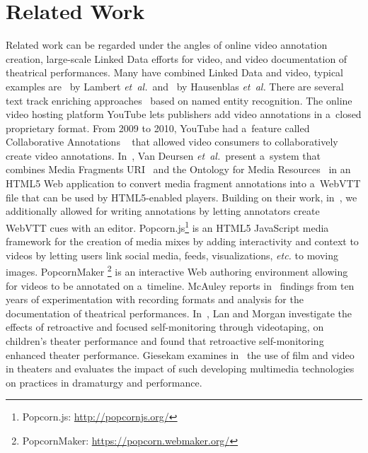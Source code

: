 \documentclass[runningheads,a4paper]{llncs}
\begin{document}
\section{Related Work}

Related work can be regarded under the angles
of online video annotation creation, large-scale Linked Data 
efforts for video, and video documentation of theatrical performances.
Many have combined Linked Data and video,
typical examples are~\cite{lambert2010linkeddata} by Lambert \emph{et~al.}\
and~\cite{hausenblas2009im} by Hausenblas \emph{et~al.}
There are several text track enriching approaches~\cite{li2013enriching,li2012creating,yi2012synote,steiner2010semwebvid}
based on named entity recognition.
The online video hosting platform YouTube
lets publishers add video annotations
in a~closed proprietary format.
From 2009 to 2010, YouTube had a~feature called
Collaborative Annotations%
~\cite{fink2009collaborativeannotations}
that allowed video consumers to collaboratively
create video annotations.
In~\cite{vandeursen2012mediafragmentannotations},
Van Deursen \emph{et~al.}\ present a~system
that combines Media Fragments URI~\cite{troncy2012mediafragments}
and the Ontology for Media Resources~\cite{lee2012mediaontology}
in an HTML5 Web application to convert
media fragment annotations into a~WebVTT file
that can be used by HTML5-enabled players.
Building on their work, in~\cite{steiner2014webvtt},
we additionally allowed for writing annotations by
letting annotators create WebVTT cues with an editor.
Popcorn.js\footnote{Popcorn.js: \url{http://popcornjs.org/}}
is an HTML5 JavaScript media framework
for the creation of media mixes
by adding interactivity and context to videos
by letting users link social media, feeds,
visualizations, \emph{etc.} to moving images.
PopcornMaker%
\footnote{PopcornMaker: \url{https://popcorn.webmaker.org/}}
is an interactive Web authoring environment
allowing for videos to be annotated on a~timeline.
McAuley reports in~\cite{mcauley1994video} findings from ten years of experimentation
with recording formats and analysis for the documentation of theatrical performances.
In~\cite{lan2003video}, Lan and Morgan investigate the effects of retroactive and
focused self-monitoring through videotaping, on children's theater performance
and found that retroactive self-monitoring enhanced theater performance.
Giesekam examines in~\cite{giesekam2007staging} the use of film and video in theaters
and evaluates the impact of such developing multimedia technologies on practices in dramaturgy and performance.
\end{document}
